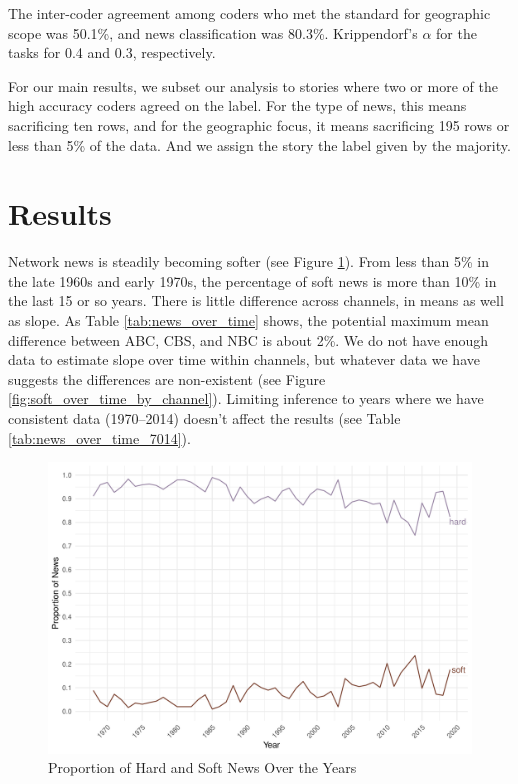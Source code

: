\documentclass[12pt, letterpaper]{article}
\begin{document}
The inter-coder agreement among coders who met the standard for geographic scope was 50.1\%, and news classification was 80.3\%. Krippendorf's $\alpha$ for the tasks for 0.4 and 0.3, respectively. 

For our main results, we subset our analysis to stories where two or more of the high accuracy coders agreed on the label. For the type of news, this means sacrificing ten rows, and for the geographic focus, it means sacrificing 195 rows or less than 5\% of the data. And we assign the story the label given by the majority.

\section*{Results}
Network news is steadily becoming softer (see Figure \ref{fig:soft_over_time}). From less than 5\% in the late 1960s and early 1970s, the percentage of soft news is more than 10\% in the last 15 or so years. There is little difference across channels, in means as well as slope. As Table \ref{tab:news_over_time} shows, the potential maximum mean difference between ABC, CBS, and NBC is about 2\%. We do not have enough data to estimate slope over time within channels, but whatever data we have suggests the differences are non-existent (see Figure \ref{fig:soft_over_time_by_channel}). Limiting inference to years where we have consistent data (1970--2014) doesn't affect the results (see Table \ref{tab:news_over_time_7014}).

\begin{figure}[H]
  \centering
  \includegraphics[width=.95\linewidth]{../figs/fig_prob_news_all.pdf}
  \caption{Proportion of Hard and Soft News Over the Years}
  \label{fig:soft_over_time}
\end{figure}
\end{document}
